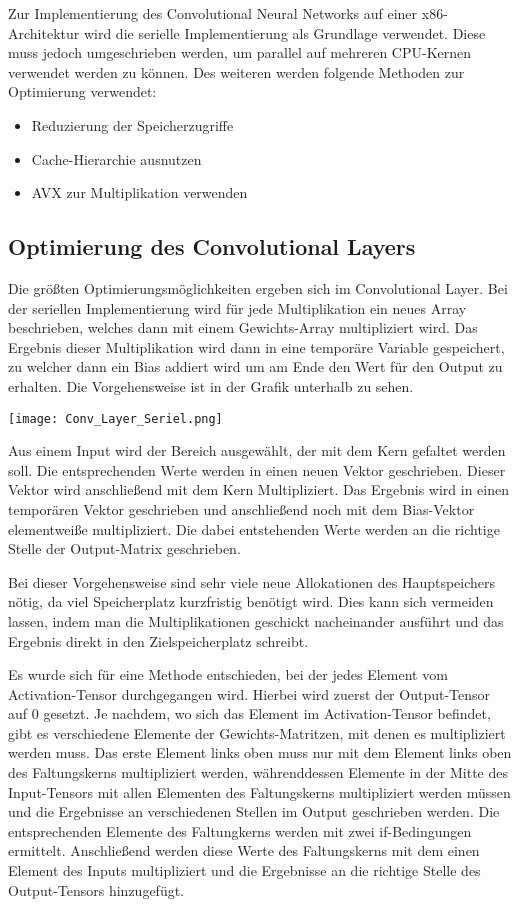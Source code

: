 \documentclass[../main.tex]{subfiles}
\begin{document}
Zur Implementierung des Convolutional Neural Networks auf einer x86-Architektur wird die serielle Implementierung als Grundlage verwendet. Diese muss jedoch umgeschrieben werden, um parallel auf mehreren CPU-Kernen verwendet werden zu können. Des weiteren werden folgende Methoden zur Optimierung verwendet:
\begin{itemize}
	\item Reduzierung der Speicherzugriffe
	\item Cache-Hierarchie ausnutzen
	\item AVX zur Multiplikation verwenden
\end{itemize}

\subsection{Optimierung des Convolutional Layers}

Die größten Optimierungsmöglichkeiten ergeben sich im Convolutional Layer. Bei der seriellen Implementierung wird für jede Multiplikation ein neues Array beschrieben, welches dann mit einem Gewichts-Array multipliziert wird. Das Ergebnis dieser Multiplikation wird dann in eine temporäre Variable gespeichert, zu welcher dann ein Bias addiert wird um am Ende den Wert für den Output zu erhalten. Die Vorgehensweise ist in der Grafik unterhalb zu sehen.

\texttt{[image: Conv\_Layer\_Seriel.png]} %

Aus einem Input wird der Bereich ausgewählt, der mit dem Kern gefaltet werden soll. Die entsprechenden Werte werden in einen neuen Vektor geschrieben. Dieser Vektor wird anschließend mit dem Kern Multipliziert. Das Ergebnis wird in einen temporären Vektor geschrieben und anschließend noch mit dem Bias-Vektor elementweiße multipliziert. Die dabei entstehenden Werte werden an die richtige Stelle der Output-Matrix geschrieben.

Bei dieser Vorgehensweise sind sehr viele neue Allokationen des Hauptspeichers nötig, da viel Speicherplatz kurzfristig benötigt wird. Dies kann sich vermeiden lassen, indem man die Multiplikationen geschickt nacheinander ausführt und das Ergebnis direkt in den Zielspeicherplatz schreibt. 

Es wurde sich für eine Methode entschieden, bei der jedes Element vom Activation-Tensor durchgegangen wird. Hierbei wird zuerst der Output-Tensor auf 0 gesetzt. Je nachdem, wo sich das Element im Activation-Tensor befindet, gibt es verschiedene Elemente der Gewichts-Matritzen, mit denen es multipliziert werden muss. Das erste Element links oben muss nur mit dem Element links oben des Faltungskerns multipliziert werden, währenddessen Elemente in der Mitte des Input-Tensors mit allen Elementen des Faltungskerns multipliziert werden müssen und die Ergebnisse an verschiedenen Stellen im Output geschrieben werden. Die entsprechenden Elemente des Faltungkerns werden mit zwei if-Bedingungen ermittelt. Anschließend werden diese Werte des Faltungskerns mit dem einen Element des Inputs multipliziert und die Ergebnisse an die richtige Stelle des Output-Tensors hinzugefügt.
\end{document}
